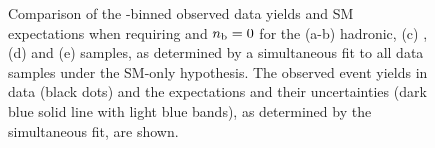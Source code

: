 \begin{figure}[t!]
\begin{center}
{    } 
    \caption{\label{fig:best-fit-le3j0b} Comparison of the
      \scalht-binned observed data yields and SM expectations when
      requiring \njetlow and $n_{\text{b}} = 0$ for the (a-b) hadronic, (c)
      \mj, (d) \mmj and (e) \gj samples, as determined by a
      simultaneous fit to all data samples under the SM-only
      hypothesis. The observed event yields in data (black dots) and
      the expectations and their uncertainties (dark blue solid line
      with light blue bands), as determined by the simultaneous fit,
      are shown. %
      }
  \end{center}
\end{figure}

